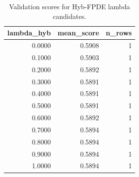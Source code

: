 \begin{table}[t]
\caption{Validation scores for Hyb-FPDE lambda candidates.}
\label{tab:lambda_distribution_computed}
\centering
\begin{tabular}{rrr}
\toprule
lambda\_hyb & mean\_score & n\_rows \\
\midrule
0.0000 & 0.5908 & 1 \\
0.1000 & 0.5903 & 1 \\
0.2000 & 0.5892 & 1 \\
0.3000 & 0.5891 & 1 \\
0.4000 & 0.5891 & 1 \\
0.5000 & 0.5891 & 1 \\
0.6000 & 0.5892 & 1 \\
0.7000 & 0.5894 & 1 \\
0.8000 & 0.5894 & 1 \\
0.9000 & 0.5894 & 1 \\
1.0000 & 0.5894 & 1 \\
\bottomrule
\end{tabular}

\end{table}
